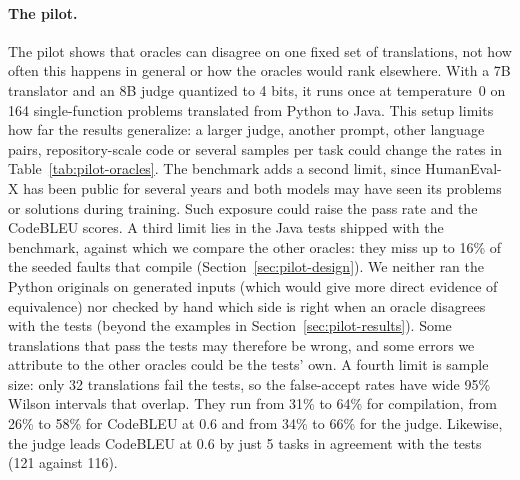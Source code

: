 \begin{added}
\paragraph{The pilot.} The pilot shows that oracles can disagree on one fixed set of translations, not how often this happens in general or how the oracles would rank elsewhere. With a 7B translator and an 8B judge quantized to 4 bits, it runs once at temperature~0 on 164 single-function problems translated from Python to Java. This setup limits how far the results generalize: a larger judge, another prompt, other language pairs, repository-scale code or several samples per task could change the rates in Table~\ref{tab:pilot-oracles}. The benchmark adds a second limit, since HumanEval-X has been public for several years and both models may have seen its problems or solutions during training. Such exposure could raise the pass rate and the CodeBLEU scores. A third limit lies in the Java tests shipped with the benchmark, against which we compare the other oracles: they miss up to 16\% of the seeded faults that compile (Section~\ref{sec:pilot-design}). We neither ran the Python originals on generated inputs (which would give more direct evidence of equivalence) nor checked by hand which side is right when an oracle disagrees with the tests (beyond the examples in Section~\ref{sec:pilot-results}). Some translations that pass the tests may therefore be wrong, and some errors we attribute to the other oracles could be the tests' own. A fourth limit is sample size: only 32 translations fail the tests, so the false-accept rates have wide 95\% Wilson intervals that overlap. They run from 31\% to 64\% for compilation, from 26\% to 58\% for CodeBLEU at 0.6 and from 34\% to 66\% for the judge. Likewise, the judge leads CodeBLEU at 0.6 by just 5 tasks in agreement with the tests (121 against 116).
\end{added}